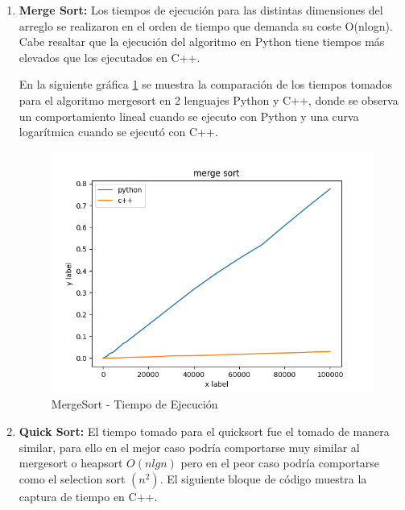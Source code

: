 \documentclass{article}
\begin{document}
\begin{enumerate}
		                \item \textbf{Merge Sort: }
		                Los tiempos de ejecución para las distintas dimensiones del arreglo se realizaron  en el orden de tiempo que demanda su coste O(nlogn). Cabe resaltar que la ejecución del algoritmo en Python tiene tiempos más elevados que los ejecutados en C++.
                            
                            
                            
                            
                            
                            En la siguiente gráfica \ref{fig:merge_diagram} se muestra la comparación de los tiempos tomados para el algoritmo mergesort en 2 lenguajes Python y C++, donde se observa un comportamiento lineal cuando se ejecuto con Python y una curva logarítmica cuando se ejecutó con C++.
                            
                            \begin{figure}[H]
                                \centering
                                \includegraphics[scale=0.6]{img/merge_diagram.png}
                                \caption{MergeSort - Tiempo de Ejecución}
                                \label{fig:merge_diagram}
                            \end{figure}
		                \item \textbf{Quick Sort: }
                            El tiempo tomado para el quicksort fue el tomado de manera similar, para ello en el mejor caso podría comportarse muy similar al mergesort o heapsort $O(nlgn)$ pero en el peor caso podría comportarse como el selection sort $(n^2)$. El siguiente bloque de código muestra la captura de tiempo en C++.
                            

\end{enumerate}
\end{document}
